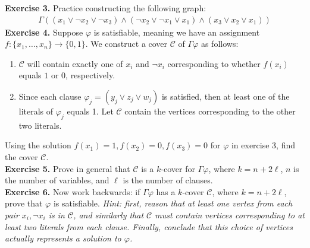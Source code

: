 \documentclass[10pt]{article}
\begin{document}
\textbf{Exercise 3.} Practice constructing the following graph:
\begin{align*}
	\Gamma((x_1 \lor \lnot x_2 \lor \lnot x_3 ) \land (\lnot x_2 \lor \lnot x_1 \lor x_1 ) \land (x_3 \lor x_2 \lor x_1))
\end{align*}
\textbf{Exercise 4.} Suppose \(\varphi\) is satisfiable, meaning we have an assignment  \(f: \{x_1, \dots, x_n\} \to \{0,1\}\). We construct a cover \(\mathcal{C}\) of \(\Gamma \varphi\) as follows: 
\begin{enumerate}
\item \(\mathcal{C}\) will contain exactly one of \(x_i\) and \(\lnot x_i\) corresponding to whether \(f(x_i)\) equals  \(1\) or \(0\), respectively.
\item Since each clause \(\varphi_j = (y_j \lor z_j \lor w_j)\) is satisfied, then at least one of the literals of \(\varphi_j\) equals 1. Let \(\mathcal{C}\) contain the vertices corresponding to the other two literals.
\end{enumerate}
Using the solution \(f(x_1) = 1, f(x_2) = 0, f(x_3) = 0\) for \(\varphi\) in exercise 3, find the cover \(\mathcal{C}\).\\

\textbf{Exercise 5.} Prove in general that \(\mathcal{C}\) is a \(k\)-cover for \(\Gamma \varphi\), where \(k = n + 2\ell\), \(n\) is the number of variables, and \(\ell\) is the number of clauses.\\

\textbf{Exercise 6.} Now work backwards: if \(\Gamma \varphi\) has a  \(k\)-cover \(\mathcal{C}\), where \(k = n + 2\ell\), prove that  \(\varphi\) is satisfiable. \textit{Hint: first, reason that at least one vertex from each pair \(x_i, \lnot x_i\) is in  \(\mathcal{C}\), and similarly that \(\mathcal{C}\)  must contain vertices corresponding to at least two literals from each clause. Finally, conclude that this  choice of vertices actually represents a solution to \(\varphi\).}
\end{document}
